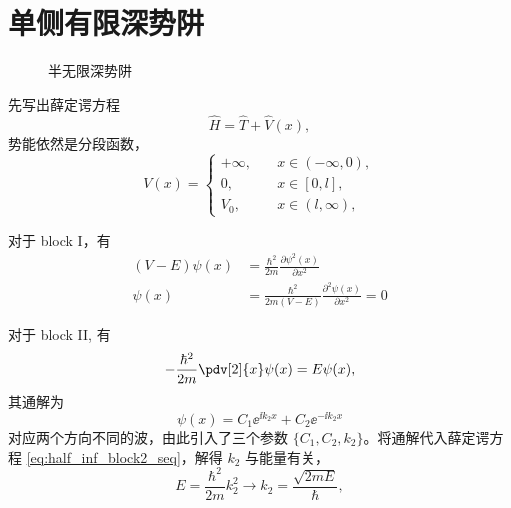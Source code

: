 \section{单侧有限深势阱}
\begin{figure}[tp]\centering
    \caption{半无限深势阱}
    \label{fig:half_inf_well}
    \end{figure}
先写出薛定谔方程
\begin{equation}
    \hat H = \hat T + \hat V(x),
\end{equation}
势能依然是分段函数，
\begin{equation}
    V(x) = 
    \begin{cases}
        +\infty, \quad &x\in(-\infty, 0),\\
        0, \quad &x\in[0,l],\\
        V_0, \quad &x\in(l,\infty),
    \end{cases}
\end{equation}

对于 block I，有
\begin{align}
    (V - E)\psi(x) &= \frac{\hbar^2}{2m} \frac{\partial \psi^2(x)}{\partial x^2} \\
    \psi(x) &= \frac{\hbar^2}{2m(V - E)} \frac{\partial^2 \psi(x)}{\partial x^2} = 0
\end{align}

对于 block II, 有
\begin{align}
    -\frac{\hbar^2}{2m} \pdv[2]{x} \psi(x) = E\psi(x),
    \label{eq:half_inf_block2_seq}
\end{align}
其通解为
\begin{equation}
    \psi(x) = C_1 \ee^{\ii k_{2}x} + C_2 \ee^{-\ii k_2 x}
\end{equation}
对应两个方向不同的波，由此引入了三个参数 $\{C_1, C_2, k_2\}$。将通解代入薛定谔方程 \eqref{eq:half_inf_block2_seq}，解得 $k_2$ 与能量有关，
\begin{equation}
    E = \frac{\hbar^2}{2m} k_2^2 \rightarrow k_2 = \frac{\sqrt{2mE}}{\hbar},
\end{equation}

